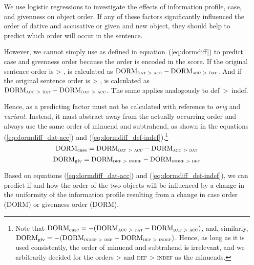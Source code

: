 \documentclass[output=paper,colorlinks,citecolor=brown]{langscibook}
\begin{document}
We use logistic regressions to investigate the effects of information profile, case, and givenness on object order. If any of these factors significantly influenced the order of dative and accusative or given and new object, they should help to predict which order will occur in the sentence. 

However, we cannot simply use \DDIFF as defined in equation~(\ref{eq:dormdiff}) to predict case and givenness order because the order is encoded in the score. If the original sentence order is \ReichDat{} > \ReichAcc{}, \DDIFF is calculated as $\textnormal{DORM}\textsubscript{\textsc{dat}{} > \textsc{acc}{}} - \textnormal{DORM}\textsubscript{\textsc{acc}{} > \textsc{dat}{}}$. And if the original sentence order is \ReichAcc{} > \ReichDat{}, \DDIFF is calculated as $\textnormal{DORM}\textsubscript{\textsc{acc}{} > \textsc{dat}{}} - \textnormal{DORM}\textsubscript{\textsc{dat}{} > \textsc{acc}{}}$. The same applies analogously to def~>~indef.

Hence, \DDIFF as a predicting factor must not be calculated with reference to \textit{orig} and \textit{variant}. Instead, it must abstract away from the actually occurring order and always use the same order of minuend and subtrahend, as shown in the equations (\ref{eq:dormdiff_dat-acc}) and (\ref{eq:dormdiff_def-indef}).\footnote{Note that $\textnormal{DORM}\textsubscript{case}= -(\textnormal{DORM}\textsubscript{\textsc{acc}{} > \textsc{dat}{}} - \textnormal{DORM}\textsubscript{\textsc{dat}{} > \textsc{acc}{}})$, and, similarly, $\textnormal{DORM}\textsubscript{giv} = -(\textnormal{DORM}\textsubscript{\textsc{indef > def}} - \textnormal{DORM}\textsubscript{\textsc{def > indef}})$. Hence, as long as it is used consistently, the order of minuend and subtrahend is irrelevant, and we arbitrarily decided for the orders \ReichDat{} > \ReichAcc{} and \textsc{def > indef} as the minuends.}
\begin{equation}
    \textnormal{DORM}\textsubscript{case} = \textnormal{DORM}\textsubscript{\textsc{dat}{} > \textsc{acc}{}} - \textnormal{DORM}\textsubscript{\textsc{acc}{} > \textsc{dat}{}}\label{eq:dormdiff_dat-acc}
\end{equation}
\begin{equation}
\textnormal{DORM}\textsubscript{giv} = \textnormal{DORM}\textsubscript{\textsc{def > indef}} - \textnormal{DORM}\textsubscript{\textsc{indef > def}}\label{eq:dormdiff_def-indef}
\end{equation}

Based on equations (\ref{eq:dormdiff_dat-acc}) and (\ref{eq:dormdiff_def-indef}), we can predict if and how the order of the two objects will be influenced by a change in the uniformity of the information profile resulting from a change in case order (\textnormal{DORM}) or givenness order (\textnormal{DORM}).
\end{document}
